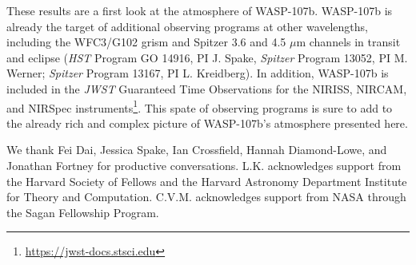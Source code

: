 \documentclass[twocolumn, trackchanges]{aastex61}
\begin{document}
These results are a first look at the atmosphere of WASP-107b.  WASP-107b is already the target of additional observing programs at other wavelengths, including the WFC3/G102 grism and Spitzer 3.6 and 4.5 $\mu$m channels in transit and eclipse (\emph{HST} Program GO 14916, PI J. Spake, \emph{Spitzer} Program 13052, PI M. Werner; \emph{Spitzer} Program 13167, PI L. Kreidberg).  In addition, WASP-107b is included in the \emph{JWST} Guaranteed Time Observations for the NIRISS, NIRCAM, and NIRSpec instruments\footnote{\url{https://jwst-docs.stsci.edu}}.  This spate of observing programs is sure to add to the already rich and complex picture of WASP-107b's atmosphere presented here. 


\acknowledgments
We thank Fei Dai, Jessica Spake, Ian Crossfield, Hannah Diamond-Lowe, and Jonathan Fortney for productive conversations. L.K. acknowledges support from the Harvard Society of Fellows and the Harvard Astronomy Department Institute for Theory and Computation. C.V.M. acknowledges support from NASA through the Sagan Fellowship Program.
\end{document}

